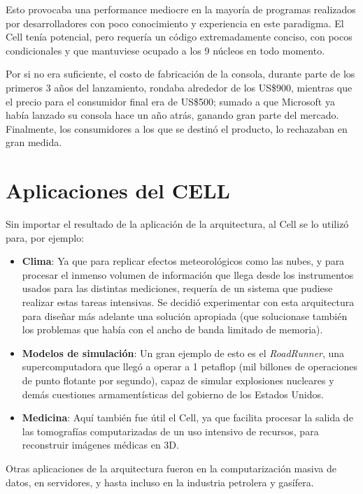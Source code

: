 \documentclass[10pt,compsoc]{IEEEtran}
\begin{document}
	Esto provocaba una performance mediocre en la mayoría de programas realizados por desarrolladores con poco conocimiento y experiencia en este paradigma. El Cell tenía potencial, pero requería un código extremadamente conciso, con pocos condicionales y que mantuviese ocupado a los 9 núcleos en todo momento.\newline
	
	Por si no era suficiente, el costo de fabricación de la consola, durante parte de los primeros 3 años del lanzamiento, rondaba alrededor de los US\$900, mientras que el precio para el consumidor final era de US\$500; sumado a que Microsoft ya había lanzado su consola hace un año atrás, ganando gran parte del mercado. Finalmente, los consumidores a los que se destinó el producto, lo rechazaban en gran medida.
	
	
	\section{Aplicaciones del CELL}
	\noindent Sin importar el resultado de la aplicación de la arquitectura, al Cell se lo utilizó para, por ejemplo:
	
	\begin{itemize}
		
		\item{{\bf{Clima}}: Ya que para replicar efectos meteorológicos como las nubes, y para procesar el inmenso volumen de información que llega desde los instrumentos usados para las distintas mediciones, requería de un sistema que pudiese realizar estas tareas intensivas. Se decidió experimentar con esta arquitectura para diseñar más adelante una solución apropiada (que solucionase también los problemas que había con el ancho de banda limitado de memoria).}\newline
		
		\item{{\bf{Modelos de simulación}}: Un gran ejemplo de esto es el \textit{RoadRunner}, una supercomputadora que llegó a operar a 1 petaflop (mil billones de operaciones de punto flotante por segundo), capaz de simular explosiones nucleares y demás cuestiones armamentísticas del gobierno de los Estados Unidos.}\newline
		
		\item{{\bf{Medicina}}: Aquí también fue útil el Cell, ya que facilita procesar la salida de las tomografías computarizadas de un uso intensivo de recursos, para reconstruir imágenes médicas en 3D.}

	\end{itemize}
	Otras aplicaciones de la arquitectura fueron en la computarización masiva de datos, en servidores, y hasta incluso en la industria petrolera y gasífera.
	
\end{document}
